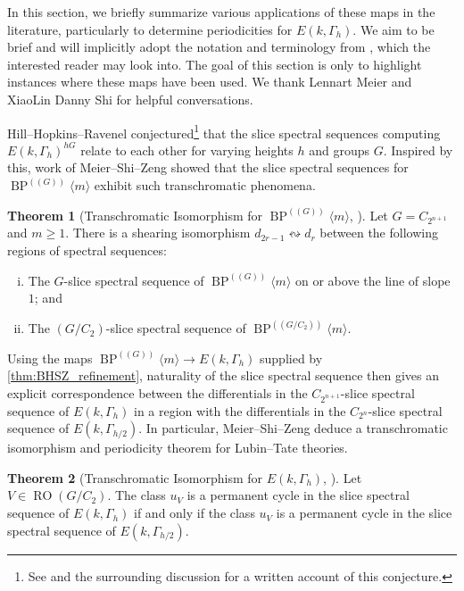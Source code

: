 \documentclass[a4paper, 10pt]{article}
\newcommand{\BPGm}{{\BP^{(\!(G)\!)}}\langle m\rangle}
\newcommand{\BP}{\operatorname{BP}}
\newcommand{\RO}{\operatorname{RO}}
\theoremstyle{definition}
\newtheorem{theorem}[theorem]{Theorem}
\begin{document}
In this section, we briefly summarize various applications of these maps in the literature, particularly to determine periodicities for \(E(k,\Gamma_h)\). We aim to be brief and will implicitly adopt the notation and terminology from \cite{meier2024transchromaticphenomenaequivariantslice,duan2025periodicityfinitecomplexityhigher}, which the interested reader may look into. The goal of this section is only to highlight instances where these maps have been used. We thank Lennart Meier and XiaoLin Danny Shi for helpful conversations.

Hill--Hopkins--Ravenel conjectured\footnote{See {\cite[Conjecture 1.1]{meier2024transchromaticphenomenaequivariantslice}} and the surrounding discussion for a written account of this conjecture.} that the slice spectral sequences computing \(E(k,\Gamma_h)^{hG}\) relate to each other for varying heights \(h\) and groups \(G\). Inspired by this, work of Meier--Shi--Zeng showed that  the slice spectral sequences for \(\BPGm\) exhibit such transchromatic phenomena.
\begin{theorem}[Transchromatic Isomorphism for \(\BPGm\), {\cite[Theorem A]{meier2024transchromaticphenomenaequivariantslice}}]
    Let \(G=C_{2^{n+1}}\) and \(m\geq 1\). 
    There is a shearing isomorphism $d_{2r-1} \leftrightsquigarrow d_r$ between the following regions of spectral sequences: 
\begin{enumerate}[(i)]
\item The $G$-slice spectral sequence of $\BPGm$ on or above the line of slope $1$; and  
\item The $(G/C_2)$-slice spectral sequence of $\BP^{(\!(G/C_2)\!)} \langle m \rangle$.
\end{enumerate}
\end{theorem}
Using the maps \(\BPGm\to E(k,\Gamma_h)\) supplied by \cref{thm:BHSZ_refinement}, naturality of the slice spectral sequence then gives an explicit correspondence between the differentials in the \(C_{2^{n+1}}\)-slice spectral sequence of \(E(k,\Gamma_h)\) in a region with the differentials in the \(C_{2^{n}}\)-slice spectral sequence of \(E(k,\Gamma_{h/2})\). In particular, Meier--Shi--Zeng deduce a transchromatic isomorphism and periodicity theorem for Lubin--Tate theories.

\begin{theorem}[Transchromatic Isomorphism for \(E(k,\Gamma_h)\), {\cite[Theorem 8.3]{meier2024transchromaticphenomenaequivariantslice}}]
    Let \(V\in \RO(G/C_2)\). 
    The class \(u_V\) is a permanent cycle in the slice spectral sequence of \(E(k,\Gamma_h)\) if and only if the class \(u_V\) is a permanent cycle in the slice spectral sequence of \(E(k,\Gamma_{h/2})\).
\end{theorem}
\end{document}
